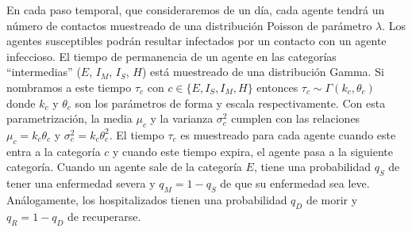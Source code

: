 En cada paso temporal, que consideraremos de un día, cada agente tendrá un número de contactos muestreado de una distribución Poisson de parámetro $\lambda$. Los agentes susceptibles podrán resultar infectados por un contacto con un agente infeccioso. El tiempo de permanencia de un agente en las categorías ``intermedias'' ($E$, $I_M$, $I_S$, $H$) está muestreado de una distribución Gamma. Si nombramos a este tiempo $\tau_c$ con $c \in \{E, I_S, I_M, H\}$ entonces $\tau_c \sim \Gamma(k_c, \theta_c)$ donde $k_c$ y $\theta_c$ son los parámetros de forma y escala respectivamente. Con esta parametrización, la media $\mu_c$ y la varianza $\sigma^2_c$ cumplen con las relaciones $\mu_c = k_c \theta_c$ y $\sigma^2_c = k_c \theta_c^2$. El tiempo $\tau_c$ es muestreado para cada agente cuando este entra a la categoría $c$ y cuando este tiempo expira, el agente pasa a la siguiente categoría. Cuando un agente sale de la categoría $E$, tiene una probabilidad $q_S$ de tener una enfermedad severa y $q_M = 1 - q_S$ de que su enfermedad sea leve. Análogamente, los hospitalizados tienen una probabilidad $q_D$ de morir y $q_R = 1 - q_D$ de recuperarse.

